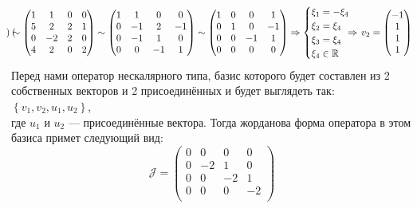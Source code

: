 \documentclass{article}
\newcommand{\shiftleft}[3]{\makebox[#1][r]{\makebox[#2][l]{#3}}}
\begin{document}
\begin{center}
$$\begin{pmatrix}
\end{pmatrix} \sim \begin{pmatrix}
1 & 1 & 0 & 0 \\
5 & 2 & 2 & 1 \\
0 & -2 & 2 & 0 \\
4 & 2 & 0 & 2 \\
\end{pmatrix} \sim \begin{pmatrix}
1 & 1 & 0 & 0 \\
0 & -1 & 2 & -1 \\
0 & -1 & 1 & 0 \\
0 & 0 & -1 & 1 \\
\end{pmatrix} \sim \begin{pmatrix}
1 & 0 & 0 & 1 \\
0 & 1 & 0 & -1 \\
0 & 0 & -1 & 1 \\
0 & 0 & 0 & 0 \\
\end{pmatrix} \Rightarrow \begin{cases}
\xi_1 = -\xi_4 \\
\xi_2 = \xi_4 \\
\xi_3 = \xi_4 \\
\xi_4 \in \mathbb{R}
\end{cases}  \shiftleft{0pt}{14pt}{$\Rightarrow$} v_2=\begin{pmatrix}
-1 \\ 1 \\ 1 \\ 1
\end{pmatrix}$$
Перед нами оператор нескалярного типа, базис которого будет составлен из 2 собственных векторов и 2 присоединённых и будет выглядеть так: $\left\{v_1, v_2, u_1, u_2\right\}$, \\ где $u_1$ и $u_2$ --- присоединённые вектора. Тогда жорданова форма оператора в этом базиса примет следующий вид:
$$\mathcal{J} = \begin{pmatrix}
0 & 0 & 0 & 0 \\
0 & -2 & 1 & 0 \\
0 & 0 & -2 & 1 \\
0 & 0 & 0 & -2 \\
\end{pmatrix}$$
\end{center}
\end{document}

